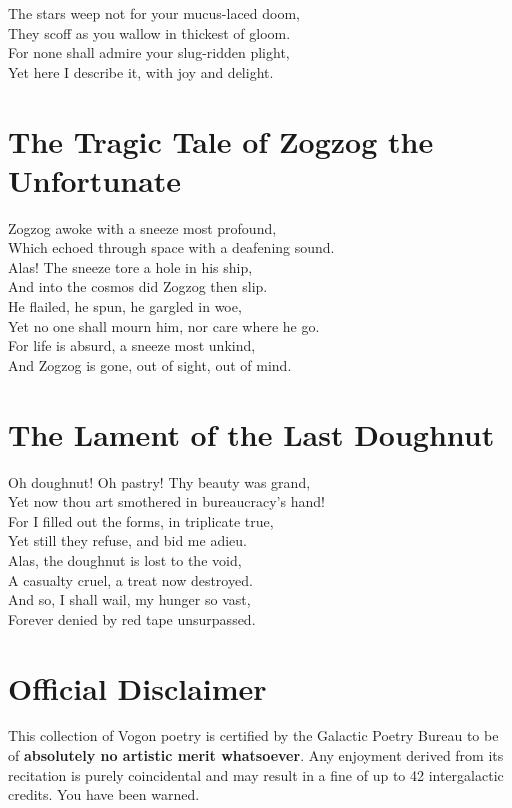 \documentclass[a4paper,12pt]{article}
\begin{document}
	The stars weep not for your mucus-laced doom,\\
	They scoff as you wallow in thickest of gloom.\\
	For none shall admire your slug-ridden plight,\\
	Yet here I describe it, with joy and delight.\\
	\vfill\newpage
	
	\section{The Tragic Tale of Zogzog the Unfortunate}
	\vfill
	\raggedright
	Zogzog awoke with a sneeze most profound,\\
	Which echoed through space with a deafening sound.\\
	Alas! The sneeze tore a hole in his ship,\\
	And into the cosmos did Zogzog then slip.\\
	
	He flailed, he spun, he gargled in woe,\\
	Yet no one shall mourn him, nor care where he go.\\
	For life is absurd, a sneeze most unkind,\\
	And Zogzog is gone, out of sight, out of mind.\\
	\vfill\newpage
	
	\section{The Lament of the Last Doughnut}
	\vfill
	\raggedright
	Oh doughnut! Oh pastry! Thy beauty was grand,\\
	Yet now thou art smothered in bureaucracy’s hand!\\
	For I filled out the forms, in triplicate true,\\
	Yet still they refuse, and bid me adieu.\\
	
	Alas, the doughnut is lost to the void,\\
	A casualty cruel, a treat now destroyed.\\
	And so, I shall wail, my hunger so vast,\\
	Forever denied by red tape unsurpassed.\\
	\vfill\newpage
	
	\section*{Official Disclaimer}
	\vfill
	\raggedright
	\noindent This collection of Vogon poetry is certified by the Galactic Poetry Bureau to be of \textbf{absolutely no artistic merit whatsoever}. Any enjoyment derived from its recitation is purely coincidental and may result in a fine of up to 42 intergalactic credits. You have been warned.\\
	
\end{document}
